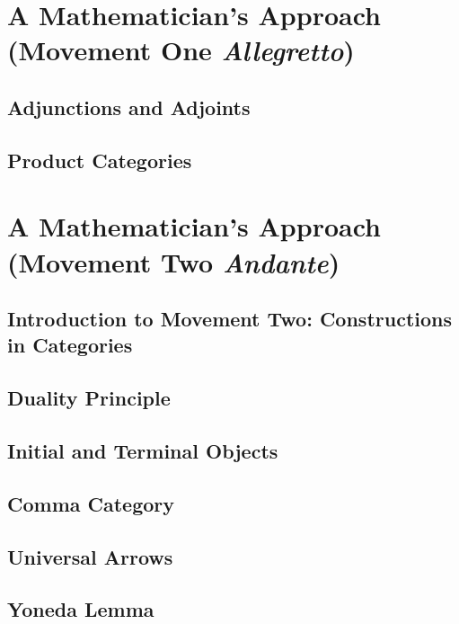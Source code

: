 \documentclass[draft]{amsart}
\theoremstyle{plain}
\theoremstyle{definition}
\begin{document}
\chapter{A Mathematician's Approach (Movement One \emph{Allegretto})}
\section{Adjunctions and Adjoints}

\section{Product Categories}

%

\chapter{A Mathematician's Approach (Movement Two \emph{Andante})}
\section{Introduction to Movement Two: Constructions in Categories}

\section{Duality Principle}

\section{Initial and Terminal Objects}

\section{Comma Category}

\section{Universal Arrows}

\section{Yoneda Lemma}

\end{document}
